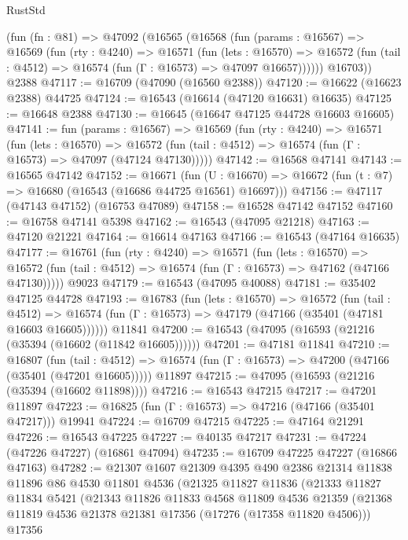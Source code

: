 \begin{lexlean}{RustStd}
\begin{coremodule}
    (fun (fn : @81) =>
    @47092
      (@16565
        (@16568
          (fun (params : @16567) =>
          @16569
            (fun (rty : @4240) =>
            @16571
              (fun (lets : @16570) =>
              @16572 (fun (tail : @4512) => @16574 (fun (Γ : @16573) => @47097 @16657))))))
        @16703))
    @2388
@47117 := @16709 (@47090 (@16560 @2388))
@47120 := @16622 (@16623 @2388) @44725
@47124 := @16543 (@16614 (@47120 @16631) @16635)
@47125 := @16648 @2388
@47130 := @16645 (@16647 @47125 @44728 @16603 @16605)
@47141 := fun (params : @16567) =>
  @16569
    (fun (rty : @4240) =>
    @16571
      (fun (lets : @16570) =>
      @16572 (fun (tail : @4512) => @16574 (fun (Γ : @16573) => @47097 (@47124 @47130)))))
@47142 := @16568 @47141
@47143 := @16565 @47142
@47152 := @16671
    (fun (U : @16670) => @16672 (fun (t : @7) => @16680 (@16543 (@16686 @44725 @16561) @16697)))
@47156 := @47117 (@47143 @47152) (@16753 @47089)
@47158 := @16528 @47142 @47152
@47160 := @16758 @47141 @5398
@47162 := @16543 (@47095 @21218)
@47163 := @47120 @21221
@47164 := @16614 @47163
@47166 := @16543 (@47164 @16635)
@47177 := @16761
    (fun (rty : @4240) =>
    @16571
      (fun (lets : @16570) =>
      @16572 (fun (tail : @4512) => @16574 (fun (Γ : @16573) => @47162 (@47166 @47130)))))
    @9023
@47179 := @16543 (@47095 @40088)
@47181 := @35402 @47125 @44728
@47193 := @16783
    (fun (lets : @16570) =>
    @16572
      (fun (tail : @4512) =>
      @16574 (fun (Γ : @16573) => @47179 (@47166 (@35401 (@47181 @16603 @16605))))))
    @11841
@47200 := @16543 (@47095 (@16593 (@21216 (@35394 (@16602 (@11842 @16605))))))
@47201 := @47181 @11841
@47210 := @16807
    (fun (tail : @4512) => @16574 (fun (Γ : @16573) => @47200 (@47166 (@35401 (@47201 @16605)))))
    @11897
@47215 := @47095 (@16593 (@21216 (@35394 (@16602 @11898))))
@47216 := @16543 @47215
@47217 := @47201 @11897
@47223 := @16825 (fun (Γ : @16573) => @47216 (@47166 (@35401 @47217))) @19941
@47224 := @16709 @47215
@47225 := @47164 @21291
@47226 := @16543 @47225
@47227 := @40135 @47217
@47231 := @47224 (@47226 @47227) (@16861 @47094)
@47235 := @16709 @47225 @47227 (@16866 @47163)
@47282 := @21307
    @1607
    @21309
    @4395
    @490
    @2386
    @21314
    @11838
    @11896
    @86
    @4530
    @11801
    @4536
    (@21325
      @11827
      @11836
      (@21333
        @11827
        @11834
        @5421
        (@21343
          @11826
          @11833
          @4568
          @11809
          @4536
          @21359
          (@21368 @11819 @4536 @21378 @21381 @17356 (@17276 (@17358 @11820 @4506)))
          @17356

\end{coremodule}
\end{lexlean}
